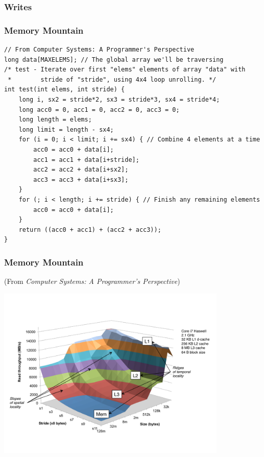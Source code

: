 \documentclass{beamer}
\begin{document}
\begin{frame}[fragile]
\frametitle{Writes}

\end{frame}

\lstset{language = c++, frameround = fttt, frame=trBL}

\begin{frame}[fragile]
\frametitle{Memory Mountain}

\scriptsize

\begin{lstlisting}
// From Computer Systems: A Programmer's Perspective
long data[MAXELEMS]; // The global array we'll be traversing
/* test - Iterate over first "elems" elements of array "data" with
 *        stride of "stride", using 4x4 loop unrolling. */
int test(int elems, int stride) {
    long i, sx2 = stride*2, sx3 = stride*3, sx4 = stride*4;
    long acc0 = 0, acc1 = 0, acc2 = 0, acc3 = 0;
    long length = elems;
    long limit = length - sx4;
    for (i = 0; i < limit; i += sx4) { // Combine 4 elements at a time
        acc0 = acc0 + data[i];
        acc1 = acc1 + data[i+stride];
        acc2 = acc2 + data[i+sx2];
        acc3 = acc3 + data[i+sx3];
    }
    for (; i < length; i += stride) { // Finish any remaining elements
        acc0 = acc0 + data[i];
    }
    return ((acc0 + acc1) + (acc2 + acc3));
}
\end{lstlisting}

\end{frame}

\begin{frame}[fragile]
\frametitle{Memory Mountain}
\tiny
(From \emph{Computer Systems: A Programmer's Perspective})

\begin{center}
  \includegraphics[width=11cm]{corei7mountain4x4.pdf}
\end{center}

\end{frame}
\end{document}

